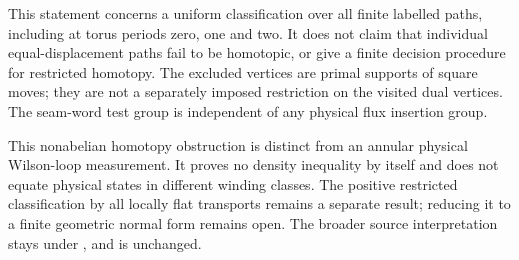 \documentclass{article}
\begin{document}
This statement concerns a uniform classification over all finite labelled
paths, including at torus periods zero, one and two. It does not claim that
individual equal-displacement paths fail to be homotopic, or give a finite
decision procedure for restricted homotopy. The excluded vertices are primal
supports of square moves; they are not a separately imposed restriction on
the visited dual vertices. The seam-word test group is independent of any
physical flux insertion group.

This nonabelian homotopy obstruction is distinct from an annular physical
Wilson-loop measurement. It proves no density inequality by itself and
does not equate physical states in different winding classes. The positive
restricted classification by all locally flat transports remains a separate
result; reducing it to a finite geometric normal form remains open.
The broader source interpretation stays under , and
 is unchanged.


\end{document}
